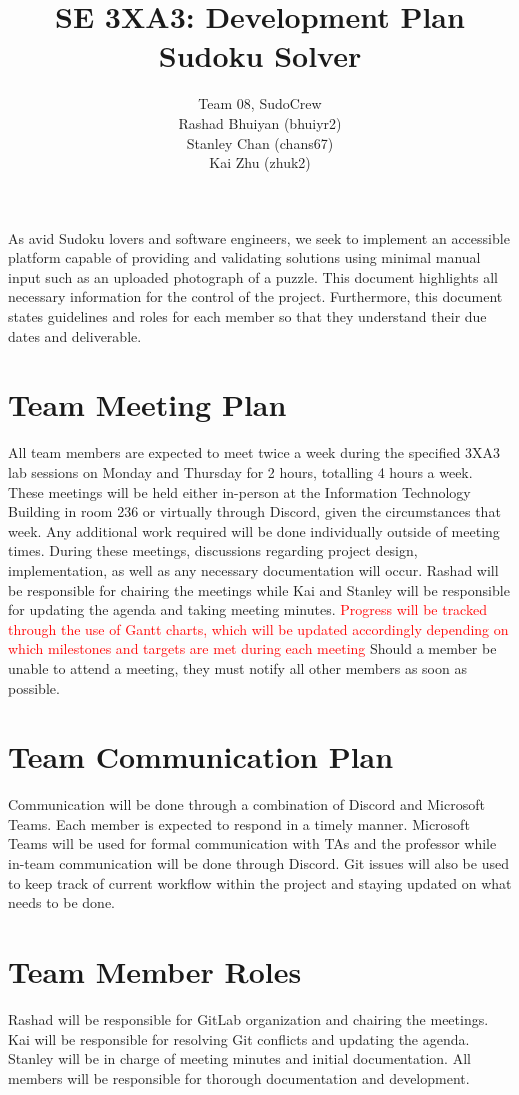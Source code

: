 \documentclass[11pt]{article}
\title{SE 3XA3: Development Plan\\Sudoku Solver}
\author{Team 08, SudoCrew
		\\ Rashad Bhuiyan (bhuiyr2)
		\\ Stanley Chan (chans67)
		\\ Kai Zhu (zhuk2)
}
\date{}
\begin{document}
\maketitle

 As avid Sudoku lovers and software engineers, we seek to implement an accessible platform capable of providing and validating solutions using minimal manual input such as an uploaded photograph of a puzzle. This document highlights all necessary information for the control of the project. Furthermore, this document states guidelines and roles for each member so that they understand their due dates and deliverable.

\section{Team Meeting Plan}
All team members are expected to meet twice a week during the specified 3XA3 lab sessions on Monday and Thursday for 2 hours, totalling 4 hours a week. These meetings will be held either in-person at the Information Technology Building in room 236 or virtually through Discord, given the circumstances that week. Any additional work required will be done individually outside of meeting times. During these meetings, discussions regarding project design, implementation, as well as any necessary documentation will occur. Rashad will be responsible for chairing the meetings while Kai and Stanley will be responsible for updating the agenda and taking meeting minutes. \textcolor{red}{Progress will be tracked through the use of Gantt charts, which will be updated accordingly depending on which milestones and targets are met during each meeting} Should a member be unable to attend a meeting, they must notify all other members as soon as possible. 

\section{Team Communication Plan}
Communication will be done through a combination of Discord and Microsoft Teams. Each member is expected to respond in a timely manner. Microsoft Teams will be used for formal communication with TAs and the professor while in-team communication will be done through Discord. Git issues will also be used to keep track of current workflow within the project and staying updated on what needs to be done.

\section{Team Member Roles}
Rashad will be responsible for GitLab organization and chairing the meetings. Kai will be responsible for resolving Git conflicts and updating the agenda. Stanley will be in charge of meeting minutes and initial documentation. All members will be responsible for thorough documentation and development.
\end{document}
